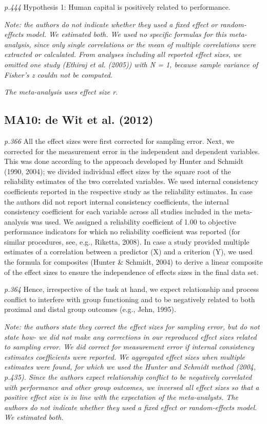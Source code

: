 \documentclass{article}
\begin{document}
\textit{p.444} Hypothesis 1: Human capital is positively related to performance.

\vspace{3 mm}
\textit{Note: the authors do not indicate whether they used a fixed effect or random-effects model. We estimated both. We used no specific formulas for this meta-analysis, since only single correlations or the mean of multiple correlations were extracted or calculated. From analyses including all reported effect sizes, we omitted one study (Ethiraj et al. (2005)) with N = 1, because sample variance of Fisher's z couldn not be computed. }

\vspace{3mm}
\textit{The meta-analysis uses effect size r.}

\subsection*{MA10: de Wit et al. (2012)}

\textit{p.366} All the effect sizes were first corrected for sampling error. Next, we corrected for the measurement error in the independent and dependent variables. This was done according to the approach developed by Hunter and Schmidt (1990, 2004); we divided individual effect sizes by the square root of the reliability estimates of the two correlated variables. We used internal consistency coefficients reported in the respective study as the reliability estimates. In case the authors did not report internal consistency coefficients, the internal consistency coefficient for each variable across all studies included in the meta-analysis was used. We assigned a reliability coefficient of 1.00 to objective performance indicators for which no reliability coefficient was reported (for similar procedures, see, e.g., Riketta, 2008). In case a study provided multiple estimates of a correlation between a predictor (X) and a criterion (Y), we used the formula for composites (Hunter \& Schmidt, 2004) to derive a linear composite of the effect sizes to ensure the independence of effects sizes in the final data set.

\textit{p.364} Hence, irrespective of the task at hand, we expect relationship and process conflict to interfere with group functioning and to be negatively related to both proximal and distal group outcomes (e.g., Jehn, 1995).

\vspace{3 mm}
\textit{Note: the authors state they correct the effect sizes for sampling error, but do not state how- we did not make any corrections in our reproduced effect sizes related to sampling error. We did correct for measurement error if internal consistency estimates coefficients were reported. We aggregated effect sizes when multiple estimates were found, for which we used the Hunter and Schmidt method (2004, p.435). Since the authors expect relationship conflict to be negatively correlated with performance and other group outcomes, we inversed all effect sizes so that a positive effect size is in line with the expectation of the meta-analysts.  The authors do not indicate whether they used a fixed effect or random-effects model. We estimated both.}
\end{document}
